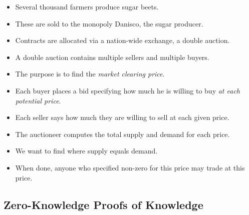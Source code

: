 \begin{frame}
  \begin{example}
    \begin{itemize}
      \item Several thousand farmers produce sugar beets.
      \item These are sold to the monopoly Danisco, the sugar producer.

        \pause{}

      \item Contracts are allocated via a nation-wide exchange, a double 
        auction.

      \item A double auction contains multiple sellers and multiple buyers.

      \item The purpose is to find the \emph{market clearing price}.

    \end{itemize}
  \end{example}
\end{frame}

\begin{frame}
  \begin{example}
    \begin{itemize}
      \item Each buyer places a bid specifying how much he is willing to buy 
        \emph{at each potential price}.

      \item Each seller says how much they are willing to sell at each given 
        price.

        \pause{}

      \item The auctioneer computes the total supply and demand for each price.

      \item We want to find where supply equals demand.

        \pause{}

      \item When done, anyone who specified non-zero for this price may trade 
        at this price.
    \end{itemize}
  \end{example}
\end{frame}

\subsection{Zero-Knowledge Proofs of Knowledge}

